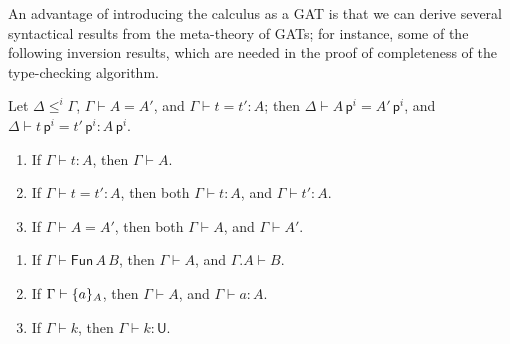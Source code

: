 \documentclass{LMCS}
\theoremstyle{plain}\newtheorem{satz}[thm]{Satz}
\newcommand{\LONGVERSION}[1]{#1}
\newcommand{\SHORTVERSION}[1]{}
\newcommand{\ctxe}[2]{#1.#2}
\newcommand{\subsTm}[2]{#1\,#2}
\newcommand{\TmU}{\mathsf{U}}
\newcommand{\F}[2]{\mathsf{Fun}\,#1\,#2}
\newcommand{\p}{\mathsf{p}}
\newcommand{\q}{\mathsf{q}}
\newcommand{\dtype}[2]{#1\vdash#2}
\newcommand{\dterm}[3]{#1\vdash#3:#2}
\newcommand{\deqtype}[3]{#1\vdash#2=#3}
\newcommand{\deqterm}[4]{#1\vdash#3=#4:#2}
\newcommand{\lift}[2]{\subsTm{#2}{\p^{#1}}}
\newcommand{\LONGVERSION}[1]{}
\newcommand{\SHORTVERSION}[1]{#1}
\begin{document}
\LONGVERSION{\noindent An advantage of introducing the calculus as a GAT is
  that we can derive several syntactical results from the meta-theory
  of GATs; for instance, some of the following inversion results,
  which are needed in the proof of completeness of the type-checking
  algorithm.  }
\begin{rem} 
  \label{rem:weak}
  Let $\Delta\leqslant^i\Gamma$, $\deqtype{\Gamma}{A}{A'}$, and
  $\deqterm{\Gamma}{A}{t}{t'}$; then
  $\deqtype{\Delta}{\lift{i}{A}}{\lift{i}{A'}}$, and
  $\deqterm{\Delta}{\lift{i}{A}}{\lift{i}{t}}{\lift{i}{t'}}$.
\end{rem}

\begin{rem}
  \label{rem:invctx}\hfill
  \begin{enumerate}[\em(1)]
  \item If $\dterm{\Gamma}{A}{t}$, then $\dtype{\Gamma}{A}$.
  \item If $\deqterm{\Gamma}{A}{t}{t'}$, then both
    $\dterm{\Gamma}{A}{t}$, and $\dterm{\Gamma}{A}{t'}$.
  \item If $\deqtype{\Gamma}{A}{A'}$, then both $\dtype{\Gamma}{A}$,
    and $\dtype{\Gamma}{A'}$.
  \end{enumerate}
\end{rem}

\begin{lem}
  \label{lem:inv-ty}\hfill
  \begin{enumerate}[\em(1)]
  \item If $\dtype{\Gamma}{\F{A}{B}}$, then $\dtype{\Gamma}{A}$, and
    $\dtype{\ctxe{\Gamma}{A}}{B}$.
  \item If $\dtype{\Gamma}{\singTm{a}{A}}$, then $\dtype{\Gamma}{A}$,
    and $\dterm{\Gamma}{A}{a}$.
  \item If $\dtype{\Gamma}{k}$, then $\dterm{\Gamma}{\TmU}{k}$.
  \end{enumerate}
\end{lem}

\SHORTVERSION{
\begin{lem}\label{lemma:inv-tm}\hfill \begin{enumerate}
  \item If $\dterm{\Gamma}{A}{\F{A'}{B'}}$, then
    $\dterm{\Gamma}{\TmU}{A'}$, and also
    $\dterm{\ctxe{\Gamma}{A'}}{\TmU}{B'}$;
  \item If $\dterm{\Gamma}{A}{\singTm{b}{B}}$, then
    $\dterm{\Gamma}{\TmU}{B}$, and also $\dterm{\Gamma}{B}{b}$;
  \item If $\dterm{\Gamma}{A}{\lambda t}$, then 
    $\dterm{\ctxe{\Gamma}{A'}}{B'}{t}$.
  \item If $\dterm{\Gamma}{\singTm{a}{A}}{t}$, then 
    $\dterm{\Gamma}{A}{t}$, and $\deqterm{\Gamma}{A}{t}{a}$.
  \item If $\dterm{\Gamma}{A}{\lift{i}{\q}}$, then either
    $\deqtype{\Gamma}{A}{\lift{i+1}{(\Gamma!i)}}$; or
    $\deqtype{\Gamma}{A}{\singTm{a}{A'}}$, and 
      $\deqterm{\Gamma}{A'}{a}{\lift{i}{\q}}$.
  \end{enumerate}
\end{lem}
}
\end{document}
